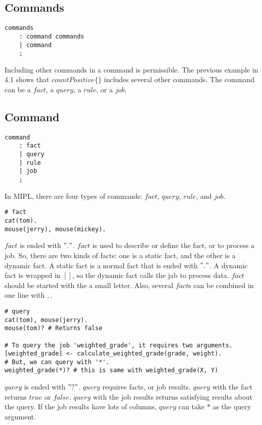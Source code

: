 \documentclass[prodmode,acmtecs]{acmsmall}
\begin{document}
\subsection{Commands}

\begin{lstlisting}
commands
	: command commands
	| command
	;
\end{lstlisting}

Including other commands in a command is permissible. The previous example in 4.1
 shows that $countPositive\{\}$ includes several other commands. The command can
 be a $fact$, a $query$, a $rule$, or a $job$.\\

\subsection{Command}

\begin{lstlisting}
command
	: fact
	| query
	| rule
	| job
	;
\end{lstlisting}

In MIPL, there are four types of commands: $fact$, $query$, $rule$, and $job$.\\

\begin{lstlisting}
# fact
cat(tom).
mouse(jerry), mouse(mickey).
\end{lstlisting}

$fact$ is ended with $"."$. $fact$ is used to describe or define the fact, or to
 process a job. So, there are two kinds of facts: one is a static fact, and the other
 is a dynamic fact. A static fact is a normal fact that is ended with $"."$. A dynamic
 fact is wrapped in $[ ]$, so the dynamic fact calls the jab to process data. $fact$
 should be started with the a small letter. Also, several $fact$s can be combined
 in one line with $,$.\\

\begin{lstlisting}
# query
cat(tom), mouse(jerry).
mouse(tom)? # Returns false

# To query the job 'weighted_grade', it requires two arguments.
[weighted_grade] <- calculate_weighted_grade(grade, weight). 
# But, we can query with '*'.
weighted_grade(*)? # this is same with weighted_grade(X, Y)
\end{lstlisting}

$query$ is ended with $"?"$. $query$ requires facts, or job results. $query$ with
 the fact returns $true$ or $false$. $query$ with the job results returns satisfying
 results about the query. If the job results have lots of columns, $query$ can
 take $*$ as the query argument.\\
\end{document}
